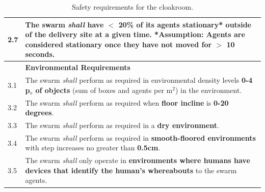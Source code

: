 \documentclass[runningheads]{llncs}
\begin{document}
\begin{table}[!t]
\begin{tabular}{p{5mm} p{116mm} }
	\hline
	2.7 & The swarm \emph{shall} have \textbf{$<$ 20\%} of its agents \textbf{stationary*} outside of the \textbf{delivery site} at a given time.
	*Assumption: Agents are considered stationary once they have not moved for $>$ \textbf{10 seconds}. \\
	\hline
	& \textbf{Environmental Requirements}\\
	\hline
	3.1 & The swarm \emph{shall} perform as required in environmental density levels \textbf{0-4 p$_o$ of objects} (sum of boxes and agents per m$^2$) in the environment. %
	\\ 
	\hline
	3.2 & The swarm \emph{shall} perform as required when \textbf{floor incline} is \textbf{0-20 degrees}.
	\\ 
	\hline
	3.3 & The swarm \emph{shall} perform as required in a \textbf{dry environment}.
	\\ 
	\hline
	3.4 & The swarm \emph{shall} perform as required in \textbf{smooth-floored environments} with step increases no greater than \textbf{0.5cm}.
	\\ 
	\hline
	3.5 & The swarm \emph{shall} only operate in \textbf{environments where humans have devices that identify the human’s whereabouts} to the swarm agents.
	\\		[1ex] 		
	\hline
\end{tabular}
\caption{\label{tab:reqs}Safety requirements for the cloakroom.}
\vspace{-4ex}
\end{table}
\normalsize
\end{document}
